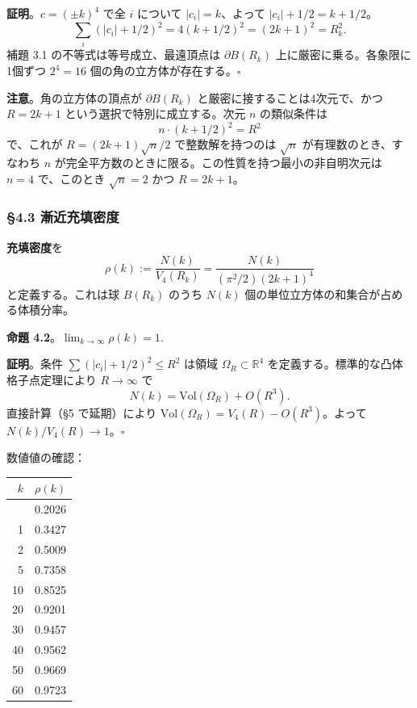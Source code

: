 \documentclass[a4paper,11pt]{ltjsarticle}
\theoremstyle{definition}
\begin{document}
\textbf{証明}。\(c = (\pm k)^4\) で全 \(i\) について
\(|c_i| = k\)、よって \(|c_i| + 1/2 = k + 1/2\)。
\[\sum_i (|c_i| + 1/2)^2 = 4 (k + 1/2)^2 = (2k + 1)^2 = R_k^2.\] 補題
3.1 の不等式は等号成立、最遠頂点は \(\partial B(R_k)\)
上に厳密に乗る。各象限に1個ずつ \(2^4 = 16\)
個の角の立方体が存在する。\(\square\)

\textbf{注意}。角の立方体の頂点が \(\partial B(R_k)\)
と厳密に接することは4次元で、かつ \(R = 2k+1\)
という選択で特別に成立する。次元 \(n\) の類似条件は
\[n \cdot (k + 1/2)^2 = R^2\] で、これが \(R = (2k+1) \sqrt{n}/2\)
で整数解を持つのは \(\sqrt{n}\) が有理数のとき、すなわち \(n\)
が完全平方数のときに限る。この性質を持つ最小の非自明次元は \(n = 4\)
で、このとき \(\sqrt{n} = 2\) かつ \(R = 2k+1\)。

\subsubsection{§4.3
漸近充填密度}\label{ux6f38ux8fd1ux5145ux586bux5bc6ux5ea6}

\textbf{充填密度}を
\[\rho(k) := \frac{N(k)}{V_4(R_k)} = \frac{N(k)}{(\pi^2/2) (2k+1)^4}\]
と定義する。これは球 \(B(R_k)\) のうち \(N(k)\)
個の単位立方体の和集合が占める体積分率。

\textbf{命題 4.2}。\emph{\(\lim_{k \to \infty} \rho(k) = 1\).}

\textbf{証明}。条件 \(\sum (|c_i| + 1/2)^2 \le R^2\) は領域
\(\Omega_R \subset \mathbb{R}^4\)
を定義する。標準的な凸体格子点定理により \(R \to \infty\) で
\[N(k) = \mathrm{Vol}(\Omega_R) + O(R^3).\] 直接計算（§5 で延期）により
\(\mathrm{Vol}(\Omega_R) = V_4(R) - O(R^3)\)。よって
\(N(k)/V_4(R) \to 1\)。\(\square\)

数値値の確認：

{\def\LTcaptype{none} %
\begin{longtable}[]{@{}rr@{}}
\toprule\noalign{}
\(k\) & \(\rho(k)\) \\
\midrule\noalign{}
\endhead
\bottomrule\noalign{}
\endlastfoot
0 & 0.2026 \\
1 & 0.3427 \\
2 & 0.5009 \\
5 & 0.7358 \\
10 & 0.8525 \\
20 & 0.9201 \\
30 & 0.9457 \\
40 & 0.9562 \\
50 & 0.9669 \\
60 & 0.9723 \\
\end{longtable}
}
\end{document}
